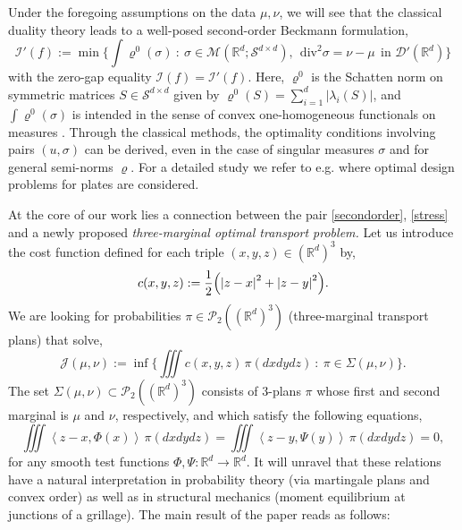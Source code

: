 \documentclass[11pt,letterpaper,reqno]{amsart}
\theoremstyle{definition}
\numberwithin{equation}{section}
\newcommand{\R}{\mathbb{R}}
\newcommand{\Rd}{\R^d}
\newcommand{\JJ}{\mathcal{J}}
\newcommand{\Mes}{{\mathcal{M}}}
\newcommand{\dive}{{\mathrm{div}}}
\newcommand{\PP}{\mathcal{P}}
\newcommand{\pairing}[1]{{\left \langle #1 \right \rangle}}
\newcommand{\abs}[1]{{\left \lvert #1 \right \rvert}}
\newcommand{\I}{\mathcal{I}}
\newcommand{\D}{\mathcal{D}}
\newcommand{\Sdd}{{\mathcal{S}^{d \times d}}}
\begin{document}
Under the foregoing assumptions on the data $\mu,\nu$, we will see that the classical duality theory leads to a well-posed second-order Beckmann formulation,
   \begin{equation}\label{stress} \I'(f):= \min
\biggl\{ \int \varrho^0(\sigma) \ : \ \sigma \in \Mes(\R^d;\Sdd), \ \ \dive^2 \sigma = \nu-\mu \ \ \text{in } \D'(\Rd) \biggr\}
\end{equation} 
with the zero-gap equality $\I(f)=\I'(f)$. 
 Here, $\varrho^0$ is the Schatten norm on symmetric matrices $S\in \Sdd$ given by $\varrho^0(S) = \sum_{i=1}^d |\lambda_i(S)|$, and
   $\int \varrho^0(\sigma)$ is intended in the sense of convex one-homogeneous functionals on measures 
 \cite{Goffman}.
Through the classical methods, the optimality  conditions involving pairs $(u,\sigma)$ can be derived,  even in the case of singular measures $\sigma$ and for  general semi-norms $\varrho$. For a detailed study we refer to e.g.  \cite{bouchitte2007} where  optimal design problems for plates
 are considered.  
   
At the core of our work lies a connection between the pair \eqref{secondorder}, \eqref{stress} and a newly proposed\textit{ three-marginal optimal transport problem.} Let us introduce the cost function defined for each triple $(x,y,z) \in (\Rd)^3$ by,
\begin{equation}\label{cost}
	c(x,y,z):= \frac{1}{2} \Bigl( \abs{z-x}^2 + \abs{z-y}^2 \Bigr).
\end{equation}
We are looking for probabilities $\pi \in \PP_2((\Rd)^3)$ (three-marginal transport plans) that solve,
\begin{equation}\label{OT3} \JJ(\mu,\nu) :=  \inf
\biggl\{ \iiint c(x,y,z) \, \pi(dxdydz)  \ :   \ \pi\in \Sigma(\mu,\nu)\biggr\}.
\end{equation} 
The set $\Sigma(\mu,\nu) \subset \PP_2((\Rd)^3)$ consists of 3-plans $\pi$ whose first and second marginal is
$\mu$ and $\nu$, respectively, and which satisfy the following  equations,
\begin{equation}\label{equilibrium}
	\iiint \! \pairing{z-x, \Phi(x)} \, \pi(dxdydz)  = \iiint \! \pairing{z-y, \Psi(y)} \, \pi(dxdydz) =0,
\end{equation}
for any smooth test functions $\Phi,\Psi: \Rd \to \Rd$.
It will unravel that these relations have a natural  interpretation in probability theory (via martingale plans and convex order) as well as
in structural mechanics (moment equilibrium at junctions of a grillage). 
The main result of the paper reads as follows:
\end{document}
